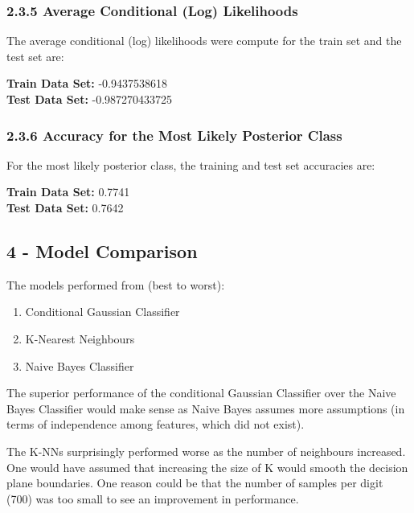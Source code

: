 \documentclass[10pt]{article}
\begin{document}
\subsubsection{2.3.5 Average Conditional (Log) Likelihoods}

The average conditional (log) likelihoods were compute for the train set and the test set are:
\begin{center}
\textbf{Train Data Set: } -0.9437538618
\\
\textbf{Test Data Set: } -0.987270433725
\end{center}

\subsubsection{2.3.6 Accuracy for the Most Likely Posterior Class}

For the most likely posterior class, the training and test set accuracies are: 
\begin{center}
\textbf{Train Data Set: } 0.7741
\\
\textbf{Test Data Set: } 0.7642
\end{center}



\subsection{4 -  Model Comparison}

The models performed from (best to worst): 
\begin{enumerate}
\item Conditional Gaussian Classifier
\item K-Nearest Neighbours
\item Naive Bayes Classifier
\end{enumerate}

The superior performance of the conditional Gaussian Classifier over the Naive Bayes Classifier would make sense as Naive Bayes assumes more assumptions (in terms of independence among features, which did not exist).

The K-NNs surprisingly performed worse as the number of neighbours increased. One would have assumed that increasing the size of K would smooth the decision plane boundaries. One reason could be that the number of samples per digit (700) was too small to see an improvement in performance. 






\pagebreak
\end{document}
